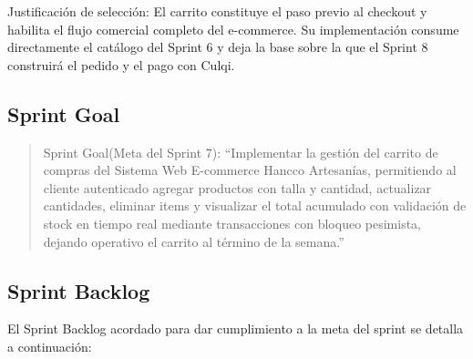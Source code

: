 \documentclass[12pt,a4paper]{article}
\begin{document}
Justificación de selección: El carrito constituye el paso previo al checkout y habilita el flujo comercial completo del e-commerce. Su implementación consume directamente el catálogo del Sprint 6 y deja la base sobre la que el Sprint 8 construirá el pedido y el pago con Culqi.

\subsection*{Sprint Goal}

\begin{quote}
Sprint Goal(Meta del Sprint 7): ``Implementar la gestión del carrito de compras del Sistema Web E-commerce Hancco Artesanías, permitiendo al cliente autenticado agregar productos con talla y cantidad, actualizar cantidades, eliminar items y visualizar el total acumulado con validación de stock en tiempo real mediante transacciones con bloqueo pesimista, dejando operativo el carrito al término de la semana.''
\end{quote}

\subsection*{Sprint Backlog}

El Sprint Backlog acordado para dar cumplimiento a la meta del sprint se detalla a continuación:
\end{document}
